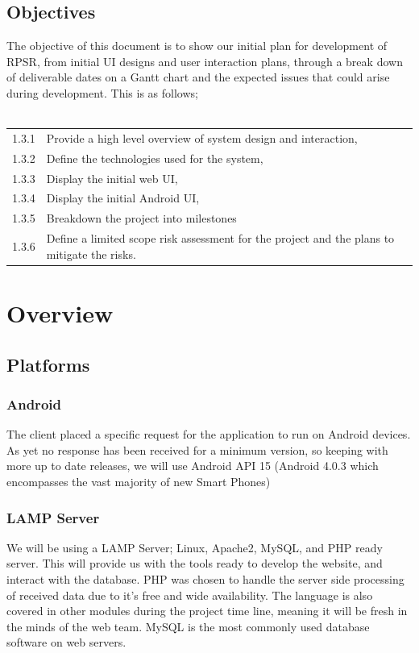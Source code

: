 \documentclass[11pt, titlepage]{article}
\begin{document}
		\subsection{Objectives}
		The objective of this document is to show our initial plan for development of RPSR, from initial UI designs and user interaction plans, through a break down of deliverable dates on a Gantt chart and the expected issues that could arise during development. This is as follows;\\ \\
			\begin{tabular}{r l}
			1.3.1 & Provide a high level overview of system design and interaction, \\
			1.3.2 & Define the technologies used for the system, \\
			1.3.3 & Display the initial web UI, \\
			1.3.4 & Display the initial Android UI, \\
			1.3.5 & Breakdown the project into milestones \\
			1.3.6 & Define a limited scope risk assessment for the project and the plans to mitigate the risks. \\
			\end{tabular}
			\clearpage
	\section{Overview}
		\subsection{Platforms}
			\subsubsection{Android}
				The client placed a specific request for the application to run on Android devices. As yet no response has been received for a minimum version, so keeping with more up to date releases, we will use Android API 15 (Android 4.0.3 which encompasses the vast majority of new Smart Phones)
			\subsubsection{LAMP Server}
				We will be using a LAMP Server; Linux, Apache2, MySQL, and PHP ready server. This will provide us with the tools ready to develop the website, and interact with the database.
				PHP was chosen to handle the server side processing of received data due to it's free and wide availability. The language is also covered in other modules during the project time line, meaning it will be fresh in the minds of the web team.
				MySQL is the most commonly used database software on web servers.
		\clearpage
\end{document}
